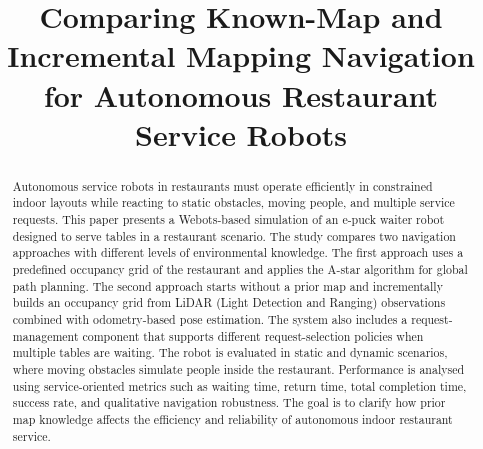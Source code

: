 \documentclass[conference]{IEEEtran}
\begin{document}
\title{Comparing Known-Map and Incremental Mapping Navigation for Autonomous Restaurant Service Robots}

\author{


}

\maketitle



\begin{abstract}

Autonomous service robots in restaurants must operate efficiently in constrained indoor layouts while reacting to static obstacles, moving people, and multiple service requests. This paper presents a Webots-based simulation of an e-puck waiter robot designed to serve tables in a restaurant scenario. The study compares two navigation approaches with different levels of environmental knowledge. The first approach uses a predefined occupancy grid of the restaurant and applies the A-star algorithm for global path planning. The second approach starts without a prior map and incrementally builds an occupancy grid from LiDAR (Light Detection and Ranging) observations combined with odometry-based pose estimation. The system also includes a request-management component that supports different request-selection policies when multiple tables are waiting. The robot is evaluated in static and dynamic scenarios, where moving obstacles simulate people inside the restaurant. Performance is analysed using service-oriented metrics such as waiting time, return time, total completion time, success rate, and qualitative navigation robustness. The goal is to clarify how prior map knowledge affects the efficiency and reliability of autonomous indoor restaurant service.
\end{abstract}
\end{document}

